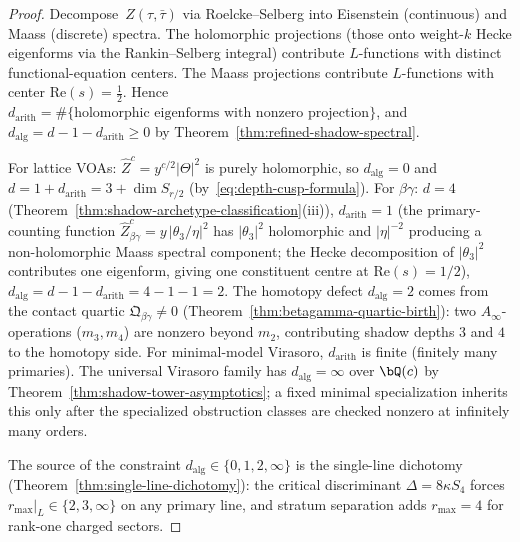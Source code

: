 \begin{proof}
Decompose~$Z(\tau,\bar\tau)$ via Roelcke--Selberg into Eisenstein
(continuous) and Maass (discrete) spectra. The holomorphic
projections (those onto weight-$k$ Hecke eigenforms
via the Rankin--Selberg integral) contribute $L$-functions with
distinct functional-equation centers. The Maass projections contribute
$L$-functions with center $\mathrm{Re}(s)=\tfrac12$. Hence
$d_{\mathrm{arith}} = \#\{\text{holomorphic eigenforms with nonzero
projection}\}$, and
$d_{\mathrm{alg}} = d - 1 - d_{\mathrm{arith}} \ge 0$ by
Theorem~\ref{thm:refined-shadow-spectral}.

For lattice VOAs: $\widehat{Z}^c = y^{c/2}\lvert\Theta\rvert^2$
is purely holomorphic, so $d_{\mathrm{alg}} = 0$ and
$d = 1 + d_{\mathrm{arith}} = 3 + \dim S_{r/2}$
(by~\eqref{eq:depth-cusp-formula}).
For $\beta\gamma$: $d = 4$
(Theorem~\ref{thm:shadow-archetype-classification}(iii)),
$d_{\mathrm{arith}} = 1$ (the primary-counting function
$\widehat{Z}^c_{\beta\gamma} = y\,|\theta_3/\eta|^2$
has $|\theta_3|^2$ holomorphic and $|\eta|^{-2}$ producing
a non-holomorphic Maass spectral component; the Hecke
decomposition of $|\theta_3|^2$ contributes one eigenform,
giving one constituent centre at $\mathrm{Re}(s)=1/2$),
$d_{\mathrm{alg}} = d - 1 - d_{\mathrm{arith}} = 4 - 1 - 1 = 2$.
The homotopy defect $d_{\mathrm{alg}} = 2$ comes from the
contact quartic $\mathfrak{Q}_{\beta\gamma} \neq 0$
(Theorem~\ref{thm:betagamma-quartic-birth}):
two $A_\infty$-operations ($m_3, m_4$) are nonzero beyond
$m_2$, contributing shadow depths $3$ and $4$ to the
homotopy side.
For minimal-model Virasoro, $d_{\mathrm{arith}}$ is finite
\textup{(}finitely many primaries\textup{)}. The universal Virasoro
family has $d_{\mathrm{alg}}=\infty$ over $\bQ(c)$ by
Theorem~\ref{thm:shadow-tower-asymptotics}; a fixed minimal
specialization inherits this only after the specialized obstruction
classes are checked nonzero at infinitely many orders.

The source of the constraint
$d_{\mathrm{alg}} \in \{0, 1, 2, \infty\}$
is the single-line dichotomy
(Theorem~\ref{thm:single-line-dichotomy}):
the critical discriminant $\Delta = 8\kappa S_4$ forces
$r_{\max}|_L \in \{2, 3, \infty\}$ on any primary line,
and stratum separation adds $r_{\max} = 4$ for rank-one
charged sectors.
\end{proof}

